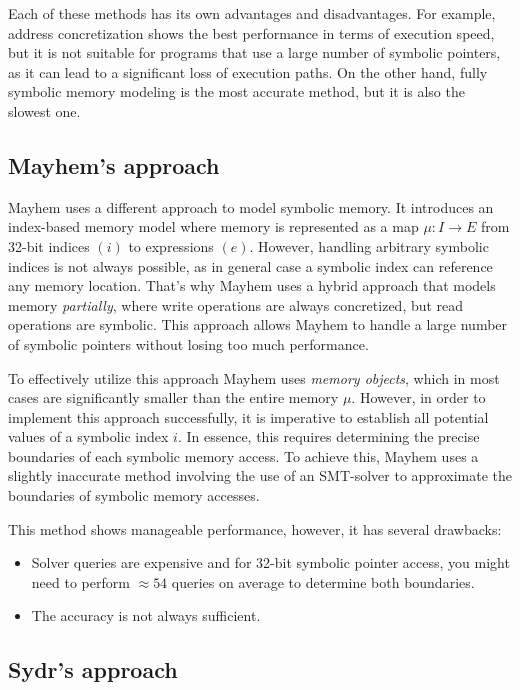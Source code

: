 \documentclass[conference]{IEEEtran}
\begin{document}
Each of these methods has its own advantages and disadvantages. For example, address concretization shows the best performance in terms of execution speed, but it is not suitable for programs that use a large number of symbolic pointers, as it can lead to a significant loss of execution paths. On the other hand, fully symbolic memory modeling is the most accurate method, but it is also the slowest one.

\subsection{Mayhem's approach}

Mayhem \cite{unleashing-mayhem-on-binary-code} uses a different approach to model symbolic memory. It introduces an index-based memory model where memory is represented as a map $ \mu : I \rightarrow E $ from 32-bit indices $ (i) $ to expressions $ (e) $. However, handling arbitrary symbolic indices is not always possible, as in general case a symbolic index can reference any memory location. That's why Mayhem uses a hybrid approach that models memory \textit{partially}, where write operations are always concretized, but read operations are symbolic. This approach allows Mayhem to handle a large number of symbolic pointers without losing too much performance.

To effectively utilize this approach Mayhem uses \textit{memory objects}, which in most cases are significantly smaller than the entire memory $ \mu $. However, in order to implement this approach successfully, it is imperative to establish all potential values of a symbolic index $ i $. In essence, this requires determining the precise boundaries of each symbolic memory access. To achieve this, Mayhem uses a slightly inaccurate method involving the use of an SMT-solver to approximate the boundaries of symbolic memory accesses.

This method shows manageable performance, however, it has several drawbacks:

\begin{itemize}
    \item Solver queries are expensive and for 32-bit symbolic pointer access, you might need to perform $ \approx 54 $ queries on average to determine both boundaries.
    \item The accuracy is not always sufficient.
\end{itemize}

\subsection{Sydr's approach}
\end{document}
